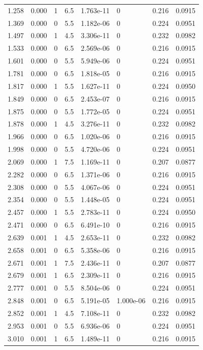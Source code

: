 \documentclass[preview]{standalone}
\begin{document}
{{\begin{tabular}{L{1.2cm}C{1.2cm} C{0.3cm}C{0.5cm} C{1.4cm}C{1.4cm} C{1.4cm}C{1.4cm}}
  1.258  &  0.000  & 1     & 6.5 &  1.763e-11  & 0  & 0.216 &  0.0915   \\ 
  1.369  &  0.000  & 0     & 5.5 &  1.182e-06  & 0  & 0.224 &  0.0951   \\ 
  1.497  &  0.000  & 1     & 4.5 &  3.306e-11  & 0  & 0.232 &  0.0982   \\ 
  1.533  &  0.000  & 0     & 6.5 &  2.569e-06  & 0  & 0.216 &  0.0915   \\ 
  1.601  &  0.000  & 0     & 5.5 &  5.949e-06  & 0  & 0.224 &  0.0951   \\ 
  1.781  &  0.000  & 0     & 6.5 &  1.818e-05  & 0  & 0.216 &  0.0915   \\ 
  1.817  &  0.000  & 1     & 5.5 &  1.627e-11  & 0  & 0.224 &  0.0950   \\ 
  1.849  &  0.000  & 0     & 6.5 &  2.453e-07  & 0  & 0.216 &  0.0915   \\ 
  1.875  &  0.000  & 0     & 5.5 &  1.772e-05  & 0  & 0.224 &  0.0951   \\ 
  1.878  &  0.000  & 1     & 4.5 &  3.276e-11  & 0  & 0.232 &  0.0982   \\ 
  1.966  &  0.000  & 0     & 6.5 &  1.020e-06  & 0  & 0.216 &  0.0915   \\ 
  1.998  &  0.000  & 0     & 5.5 &  4.720e-06  & 0  & 0.224 &  0.0951   \\ 
  2.069  &  0.000  & 1     & 7.5 &  1.169e-11  & 0  & 0.207 &  0.0877   \\ 
  2.282  &  0.000  & 0     & 6.5 &  1.371e-06  & 0  & 0.216 &  0.0915   \\ 
  2.308  &  0.000  & 0     & 5.5 &  4.067e-06  & 0  & 0.224 &  0.0951   \\ 
  2.354  &  0.000  & 0     & 5.5 &  1.448e-05  & 0  & 0.224 &  0.0951   \\ 
  2.457  &  0.000  & 1     & 5.5 &  2.783e-11  & 0  & 0.224 &  0.0950   \\ 
  2.471  &  0.000  & 0     & 6.5 &  6.491e-10  & 0  & 0.216 &  0.0915   \\ 
  2.639  &  0.001  & 1     & 4.5 &  2.653e-11  & 0  & 0.232 &  0.0982   \\ 
  2.658  &  0.001  & 0     & 6.5 &  5.358e-06  & 0  & 0.216 &  0.0915   \\ 
  2.671  &  0.001  & 1     & 7.5 &  2.436e-11  & 0  & 0.207 &  0.0877   \\ 
  2.679  &  0.001  & 1     & 6.5 &  2.309e-11  & 0  & 0.216 &  0.0915   \\ 
  2.777  &  0.001  & 0     & 5.5 &  8.504e-06  & 0  & 0.224 &  0.0951   \\ 
  2.848  &  0.001  & 0     & 6.5 &  5.191e-05  & 1.000e-06  & 0.216 &  0.0915   \\ 
  2.852  &  0.001  & 1     & 4.5 &  7.108e-11  & 0  & 0.232 &  0.0982   \\ 
  2.953  &  0.001  & 0     & 5.5 &  6.936e-06  & 0  & 0.224 &  0.0951   \\ 
  3.010  &  0.001  & 1     & 6.5 &  1.489e-11  & 0  & 0.216 &  0.0915   \\ 
\hline 
\end{tabular} 

}}
\end{document}
